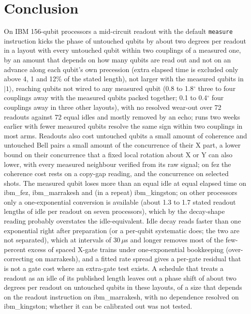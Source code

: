 \documentclass[reprint,amsmath,amssymb,aps,superscriptaddress,nofootinbib]{revtex4-2}
\newcommand{\us}{\,$\mu$s}
\begin{document}
\section{Conclusion}

On IBM 156-qubit processors a mid-circuit readout with the default \texttt{measure} instruction kicks the phase of untouched qubits by about two degrees per readout in a layout with every untouched qubit within two couplings of a measured one, by an amount that depends on how many qubits are read out and not on an advance along each qubit's own precession (extra elapsed time is excluded only above 4, 1 and 12\% of the stated length), not larger with the measured qubits in $|1\rangle$, reaching qubits not wired to any measured qubit (0.8 to 1.8$^\circ$ three to four couplings away with the measured qubits packed together; 0.1 to 0.4$^\circ$ four couplings away in three other layouts), with no resolved wear-out over 72 readouts against 72 equal idles and mostly removed by an echo; runs two weeks earlier with fewer measured qubits resolve the same sign within two couplings in most arms. Readouts also cost untouched qubits a small amount of coherence and untouched Bell pairs a small amount of the concurrence of their X part, a lower bound on their concurrence that a fixed local rotation about X or Y can also lower, with every measured neighbour verified from its raw signal; on fez the coherence cost rests on a copy-gap reading, and the concurrence on selected shots. The measured qubit loses more than an equal idle at equal elapsed time on ibm\_fez, ibm\_marrakesh and (in a repeat) ibm\_kingston; on other processors only a one-exponential conversion is available (about 1.3 to 1.7 stated readout lengths of idle per readout on seven processors), which by the decay-shape reading probably overstates the idle-equivalent. Idle decay reads faster than one exponential right after preparation (or a per-qubit systematic does; the two are not separated), which at intervals of 30\us{} and longer removes most of the few-percent excess of spaced X-gate trains under one-exponential bookkeeping (over-correcting on marrakesh), and a fitted rate spread gives a per-gate residual that is not a gate cost where an extra-gate test exists. A schedule that treats a readout as an idle of its published length leaves out a phase shift of about two degrees per readout on untouched qubits in these layouts, of a size that depends on the readout instruction on ibm\_marrakesh, with no dependence resolved on ibm\_kingston; whether it can be calibrated out was not tested.
\end{document}
